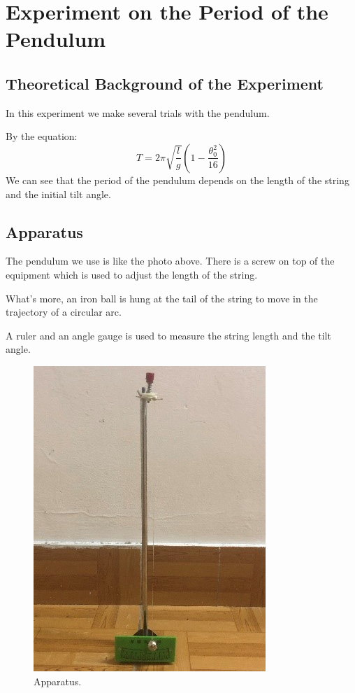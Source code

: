 \documentclass[12pt]{report}
\begin{document}
\section{Experiment on the Period of the Pendulum}
\subsection{Theoretical Background of the Experiment}
In this experiment we make several trials with the pendulum.

By the equation:
\begin{equation*}
    T=2\pi\sqrt{\dfrac{l}{g}}(1-\dfrac{\theta_0^2}{16})
\end{equation*}
We can see that the period of the pendulum depends on the length of the string and the initial tilt angle.
\subsection{Apparatus}
The pendulum we use is like the photo above. There is a screw on top of the equipment which is used to adjust the length of the string.

What’s more, an iron ball is hung at the tail of the string to move in the trajectory of a circular arc.

A ruler and an angle gauge is used to measure the string length and the tilt angle.
\begin{figure}[H]
    \centering
    \includegraphics[width=0.7\linewidth]{3.jpg}
    \caption{Apparatus.}
\end{figure}
\end{document}
